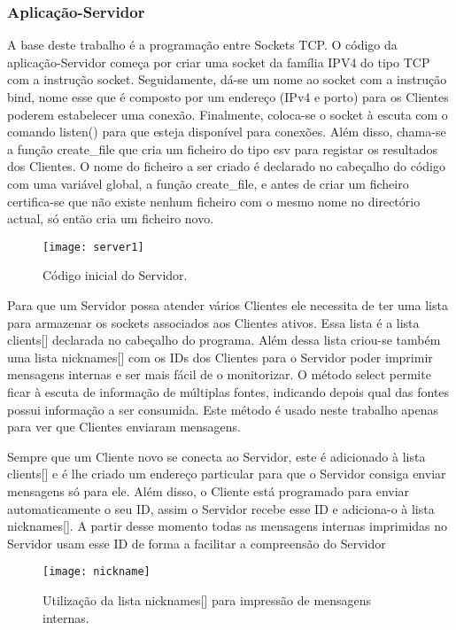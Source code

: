 \subsubsection{Aplicação-Servidor}
A base deste trabalho é a programação entre Sockets TCP.
O código da aplicação-Servidor começa por criar uma socket da família IPV4 do tipo TCP com a instrução socket. Seguidamente, dá-se um nome ao socket com a instrução bind, nome esse que é composto por um endereço (IPv4 e porto) para os Clientes poderem estabelecer uma conexão. Finalmente, coloca-se o socket à escuta com o comando listen() para que esteja disponível para conexões. Além disso, chama-se a função create\_file que cria um ficheiro do tipo csv para registar os resultados dos Clientes. O nome do ficheiro a ser criado é declarado no cabeçalho do código com uma variável global, a função create\_file, e antes de criar um ficheiro certifica-se que não existe nenhum ficheiro com o mesmo nome no directório actual, só então cria um ficheiro novo.

\begin{figure}[H]
	\centering
	\texttt{[image: server1]}
	\caption{Código inicial do Servidor.\\}
	\label{fig:server1}
\end{figure} 

\clearpage

Para que um Servidor possa atender vários Clientes ele necessita de ter uma lista para armazenar os sockets associados aos Clientes ativos. Essa lista é a lista clients[] declarada no cabeçalho do programa. Além dessa lista criou-se também uma lista nicknames[] com os IDs dos Clientes para o Servidor poder imprimir mensagens internas e ser mais fácil de o monitorizar.
O método select permite ficar à escuta de informação de múltiplas fontes, indicando depois qual das fontes possui informação a ser consumida. Este método é usado neste trabalho apenas para ver que Clientes enviaram mensagens.

Sempre que um Cliente novo se conecta ao Servidor, este é adicionado à lista clients[] e é lhe criado um endereço particular para que o Servidor consiga enviar mensagens só para ele. Além disso, o Cliente está programado para enviar automaticamente o seu ID, assim o Servidor recebe esse ID e adiciona-o à lista nicknames[]. A partir desse momento todas as mensagens internas imprimidas no Servidor usam esse ID de forma a facilitar a compreensão do Servidor

\begin{figure}[H]
	\centering
	\texttt{[image: nickname]}
	\caption{Utilização da lista nicknames[] para impressão de mensagens internas.\\}
	\label{fig:nickname}
\end{figure} 

